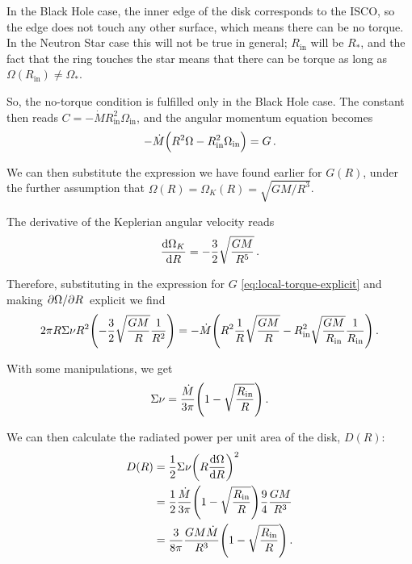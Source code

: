 \documentclass[main.tex]{subfiles}
\begin{document}
In the Black Hole case, the inner edge of the disk corresponds to the ISCO, so the edge does not touch any other surface, which means there can be no torque. 
In the Neutron Star case this will not be true in general; \(R _{\text{in}}\) will be \(R_{*}\), and the fact that the ring touches the star means that there can be torque as long as \(\Omega (R _{\text{in}}) \neq \Omega _*\). 

So, the no-torque condition is fulfilled only in the Black Hole case. 
The constant then reads \(C = -\dot{M} R^2 _{\text{in}} \Omega _{\text{in}}\), and the angular momentum equation becomes 
%
\begin{align}
-\dot{M} \qty(R^2 \Omega - R^2 _{\text{in}} \Omega _{\text{in}}) = G
\,.
\end{align}

We can then substitute the expression we have found earlier for \(G(R)\), under the further assumption that \(\Omega (R) = \Omega _K (R )= \sqrt{GM / R^3}\). 

The derivative of the Keplerian angular velocity reads 
%
\begin{align}
\dv{\Omega _K}{R} = - \frac{3}{2} \sqrt{ \frac{GM}{R^5}}
\,.
\end{align}

Therefore, substituting in the expression for \(G\) \eqref{eq:local-torque-explicit} and making \(\pdv*{\Omega }{R}\) explicit we find 
%
\begin{align}
2 \pi R \Sigma \nu R^2 \qty(- \frac{3}{2} \sqrt{ \frac{GM}{R}} \frac{1}{R^2}) = - \dot{M} \qty(R^2 \frac{1}{R} \sqrt{ \frac{GM}{R}}- R^2 _{\text{in}} \sqrt{ \frac{GM}{R _{\text{in}}}} \frac{1}{R _{\text{in}}})
\,.
\end{align}

With some manipulations, we get 
%
\begin{align}
\Sigma \nu = \frac{\dot{M}}{3 \pi } \qty(1 - \sqrt{\frac{R _{\text{in}}}{R}})
\,.
\end{align}

We can then calculate the radiated power per unit area of the disk, \(D(R)\): 
%
\begin{align}
D(R) &= \frac{1}{2} \Sigma \nu \qty(R \dv{\Omega }{R})^2  \\
&= \frac{1}{2} \frac{\dot{M}}{3 \pi } \qty(1 - \sqrt{\frac{R _{\text{in}}}{R}}) \frac{9}{4} \frac{GM}{R^3}  \\
&= \frac{3}{8 \pi } \frac{G M \dot{M}}{R^3} \qty(1 - \sqrt{ \frac{R _{\text{in}}}{R}})
\,.
\end{align}
\end{document}
